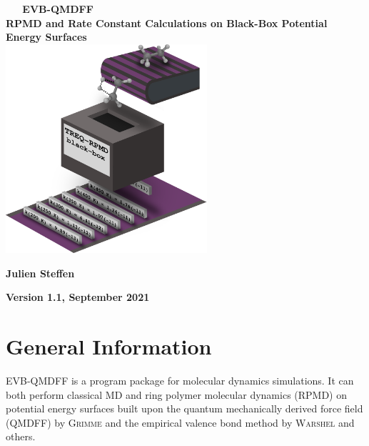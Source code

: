 \documentclass[12pt,a4paper]{scrartcl}
\begin{document}
\begin{titlepage}
 \begin{adjustwidth}{0cm}{-1cm}

\begin{center}
\vspace{4cm} ~
\newline ~
\vspace{0.2cm}
\newline
\textbf{\LARGE EVB-QMDFF} \\[0.8cm]
\textbf{\Large RPMD and Rate Constant Calculations on Black-Box Potential Energy Surfaces}\\[1.3cm]


\includegraphics[width=0.56\textwidth]{figures/titlepic.png}



\vspace{1.3cm}

\textbf{\large{Julien Steffen}}

\vspace{1.3cm}
\textbf{\Large{Version 1.1, September 2021}}


\end{center}



\vfill
\end{adjustwidth}


\end{titlepage}

\tableofcontents

\newpage

\section{General Information}

EVB-QMDFF is a program package for molecular dynamics simulations.
It can both perform classical MD and ring polymer molecular dynamics (RPMD) on
potential energy surfaces built upon the quantum mechanically derived force field (QMDFF)
by \textsc{Grimme} and the empirical valence bond method by \textsc{Warshel} and others.
\end{document}
